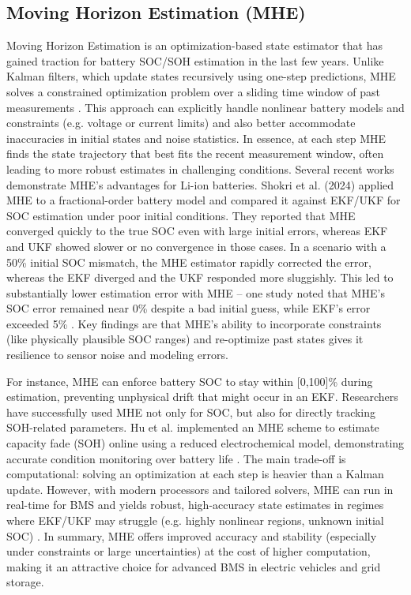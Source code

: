 \subsection{Moving Horizon Estimation (MHE)}
Moving Horizon Estimation is an optimization-based state estimator that has gained traction for battery SOC/SOH estimation in the last few years. Unlike Kalman filters, which update states recursively using one-step predictions, MHE solves a constrained optimization problem over a sliding time window of past measurements \cite{10483287}. This approach can explicitly handle nonlinear battery models and constraints (e.g. voltage or current limits) and also better accommodate inaccuracies in initial states and noise statistics. In essence, at each step MHE finds the state trajectory that best fits the recent measurement window, often leading to more robust estimates in challenging conditions. Several recent works demonstrate MHE’s advantages for Li-ion batteries. Shokri et al. (2024) applied MHE to a fractional-order battery model and compared it against EKF/UKF for SOC estimation under poor initial conditions. They reported that MHE converged quickly to the true SOC even with large initial errors, whereas EKF and UKF showed slower or no convergence in those cases. In a scenario with a 50\% initial SOC mismatch, the MHE estimator rapidly corrected the error, whereas the EKF diverged and the UKF responded more sluggishly. This led to substantially lower estimation error with MHE – one study noted that MHE’s SOC error remained near 0\% despite a bad initial guess, while EKF’s error exceeded 5\% \cite{10483287}. Key findings are that MHE’s ability to incorporate constraints (like physically plausible SOC ranges) and re-optimize past states gives it resilience to sensor noise and modeling errors. 

For instance, MHE can enforce battery SOC to stay within [0,100]\% during estimation, preventing unphysical drift that might occur in an EKF. Researchers have successfully used MHE not only for SOC, but also for directly tracking SOH-related parameters. Hu et al. implemented an MHE scheme to estimate capacity fade (SOH) online using a reduced electrochemical model, demonstrating accurate condition monitoring over battery life \cite{GUO2024113850}. The main trade-off is computational: solving an optimization at each step is heavier than a Kalman update. However, with modern processors and tailored solvers, MHE can run in real-time for BMS and yields robust, high-accuracy state estimates in regimes where EKF/UKF may struggle (e.g. highly nonlinear regions, unknown initial SOC) \cite{10483287}. In summary, MHE offers improved accuracy and stability (especially under constraints or large uncertainties) at the cost of higher computation, making it an attractive choice for advanced BMS in electric vehicles and grid storage.

